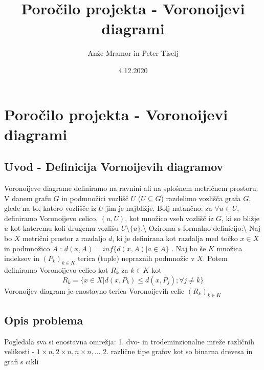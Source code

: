\documentclass[
]{article}
\title{Poročilo projekta - Voronoijevi diagrami}
\author{Anže Mramor in Peter Tiselj}
\date{4.12.2020}
\begin{document}
\maketitle

\hypertarget{poroux10dilo-projekta---voronoijevi-diagrami}{%
\section{Poročilo projekta - Voronoijevi
diagrami}\label{poroux10dilo-projekta---voronoijevi-diagrami}}

\hypertarget{uvod---definicija-vornoijevih-diagramov}{%
\subsection{Uvod - Definicija Vornoijevih
diagramov}\label{uvod---definicija-vornoijevih-diagramov}}

Voronoijeve diagrame definiramo na ravnini ali na splošnem metričnem
prostoru. V danem grafu \(G\) in podmnožici vozlišč \(U\)
(\(U \subseteq G\)) razdelimo vozlišča grafa \(G\), glede na to, katero
vozlišče iz \(U\) jim je najbližje. Bolj natančno: za
\(\forall u \in U\), definiramo Voronoijevo celico, \((u, U)\), kot
množico vseh vozlišč iz \(G\), ki so bližje \(u\) kot kateremu koli
drugemu vozlišu \(U \setminus \{u\}\).\textbackslash{} Oziroma s
formalno definicijo:\textbackslash{} Naj bo \(X\) metrični prostor z
razdaljo \(d\), ki je definirana kot razdalja med točko \(x \in X\) in
podmnožico \(A\) : \(d(x, A) = inf \{d(x, A) | a \in A \}\) . Naj bo še
\(K\) množica indeksov in \((P_k)_{k \in K}\) terica (tuple) nepraznih
podmnožic v \(X\). Potem definiramo Voronoijevo celico kot \(R_k\) za
\(k \in K\) kot
\[ R_k = \{ x \in X | d(x,P_{k}) \leq d(x,P_{j}) ; \forall j \neq k \} \]
Voronoijev diagram je enostavno terica Voronoijevih celic
\((R_k)_{k \in K}\)

\hypertarget{opis-problema}{%
\subsection{Opis problema}\label{opis-problema}}

Pogledala sva si enostavna omrežja: 1. dvo- in trodeminzionalne mreže
različnih velikosti - $1 \times n, 2 \times n, n \times n, \dots $ 2.
različne tipe grafov kot so binarna drevesa in grafi s cikli
\end{document}
